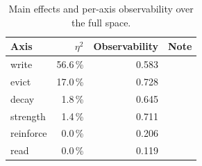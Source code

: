\begin{table}[t]
\centering
\caption{Main effects and per-axis observability over the full space.}
\label{tab:main-effects}
\begin{tabular}{lrrl}
\hline
Axis & $\eta^2$ & Observability & Note \\
\hline
write & 56.6\,\% & 0.583 &  \\
evict & 17.0\,\% & 0.728 &  \\
decay & 1.8\,\% & 0.645 &  \\
strength & 1.4\,\% & 0.711 &  \\
reinforce & 0.0\,\% & 0.206 &  \\
read & 0.0\,\% & 0.119 &  \\
\hline
\end{tabular}
\end{table}
